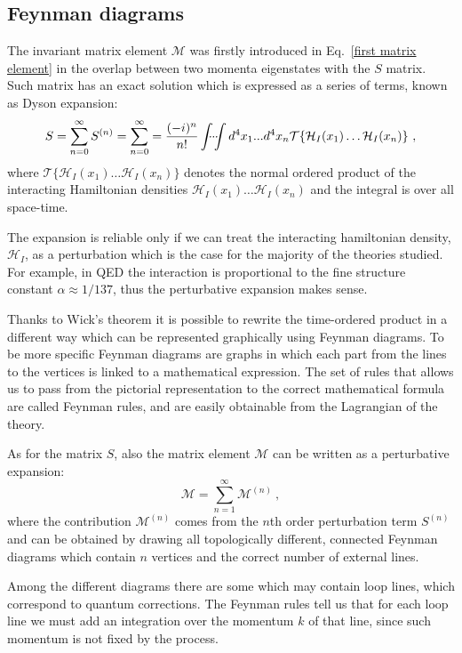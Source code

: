 \documentclass[../main/main.tex]{subfiles}
\begin{document}
\subsection{Feynman diagrams}
The invariant matrix element $\mathcal{M}$ was firstly introduced in Eq.~\ref{first matrix element} in the overlap between two momenta
eigenstates with the $S$ matrix.
Such matrix has an exact solution which is expressed as a series of terms, known as Dyson expansion:
\begin{equation}
	\label{S}
	S = \sum_{n = 0}^{\infty} S^{(n)} = \sum_{n = 0}^{\infty} =  \frac{(-i)^n}{n!}\idotsint d^4 x_1 ... d^4 x_n \mathcal{T}\{ \mathcal{H}_I(x_1) \dots \mathcal{H}_I(x_n) \} \ ,
\end{equation}
where $\mathcal{T}\{ \mathcal{H}_I(x_1) \dots \mathcal{H}_I(x_n) \}$ denotes the normal ordered product of the interacting 
Hamiltonian densities $ \mathcal{H}_I(x_1) \dots \mathcal{H}_I(x_n)$ and the integral is over all space-time.

The expansion is reliable only if we can treat the interacting hamiltonian density, $\mathcal{H}_I$, as a perturbation which is the case for 
the majority of the theories studied. For example, in QED the interaction is proportional to the fine structure constant $\alpha \approx 1/137$, thus the perturbative expansion makes sense.

Thanks to Wick's theorem it is possible to rewrite the time-ordered product in a different way which can be represented graphically using Feynman diagrams. 
To be more specific Feynman diagrams are graphs in which each part from the lines to the vertices is linked to a mathematical expression.
The set of rules that allows us to pass from the pictorial representation to the correct mathematical formula are called Feynman rules, and
are easily obtainable from the Lagrangian of the theory.

As for the matrix $S$, also the matrix element $\mathcal{M}$ can be written as a perturbative expansion:
\begin{equation}
	\label{exp M}
	\mathcal{M}= \sum_{n = 1}^{\infty} \mathcal{M}^{(n)} \ ,
\end{equation} 
where the contribution $\mathcal{M}^{(n)} $ comes from the $n$th order perturbation term $S^{(n)}$ and can be obtained by drawing 
all topologically different, connected Feynman diagrams which contain $n$ vertices and the correct number of external lines.

Among the different diagrams there are some which may contain loop lines, which correspond to quantum corrections.
 The Feynman rules tell us that for each loop line we must add an integration over the momentum $k$ of that line, since such momentum is not fixed by the process.
\end{document}
